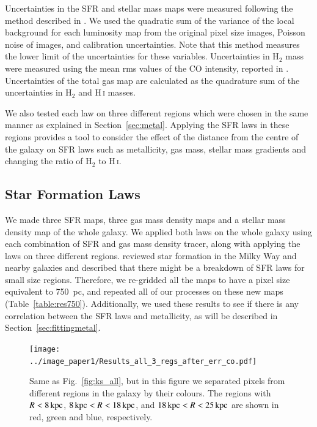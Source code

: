 Uncertainties in the SFR and stellar mass maps  were measured following the method described in \citet{Kennicutt07}. We used the quadratic sum of the variance of the local background for each luminosity map from the original pixel size images, Poisson noise of images, and calibration uncertainties. Note that this method measures the lower limit of the uncertainties for these variables. Uncertainties in H$_2$ mass were measured using the mean rms values of the  CO intensity, reported in \cite{Nieten06}. Uncertainties of the total gas map are calculated as the quadrature sum of the uncertainties in  H$_2$ and H\,{\textsc i} masses. 

We also tested each law on three different regions which were chosen in the same manner as explained in Section~\ref{sec:metal}. Applying the SFR laws in these regions provides a tool to consider the effect of the distance from the centre of the galaxy on SFR laws such as metallicity, gas mass, stellar mass gradients and changing the ratio of H$_2$ to H\,{\textsc i}. 
\subsection{Star Formation Laws}
\label{sec: sfl}

We made three SFR maps, three gas mass density maps and a stellar mass density map of the whole galaxy. We applied both laws on the whole galaxy using each combination of SFR and gas mass density tracer, along with applying the laws on three different regions. \citet{Kennicutt12} reviewed star formation in the Milky Way and nearby galaxies and described that there might be a breakdown of SFR laws for small size regions. Therefore, we re-gridded all the maps to have a pixel size equivalent to 750~pc, and repeated all of our processes on these new maps (Table~\ref{table:res750}). Additionally, we used these results to see if there is any correlation between the SFR laws and metallicity, as will be described in Section~\ref{sec:fittingmetal}.
 
\begin{figure}

\texttt{[image: ../image\_paper1/Results\_all\_3\_regs\_after\_err\_co.pdf]}
\caption[Results from fitting the Kennicutt-Schmidt law to data from three regions in M31]{Same as Fig.~\ref{fig:ks_all}, but in this figure we separated pixels from different regions in the galaxy by their colours. The regions with $R< 8\,{\rm kpc}$, $8\,{\rm kpc} < R < 18\,{\rm kpc}$, and $18\,{\rm kpc} < R < 25\,{\rm kpc}$ are shown in red, green and blue, respectively.}%
\label{fig:ks,regs}
\end{figure}


